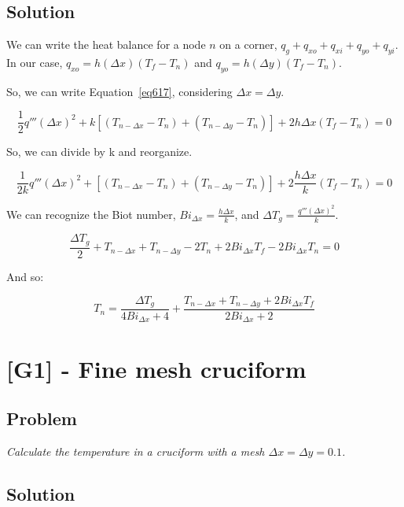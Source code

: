 \subsection{Solution}

We can write the heat balance for a node $n$ on a corner, $q_g + q_{xo} + q_{xi} + q_{yo} + q_{yi}$. In our case, $q_{xo} = h(\Delta x)(T_f - T_n)$ and $q_{yo} = h(\Delta y)(T_f - T_n)$.

So, we can write Equation~\ref{eq617}, considering $\Delta x = \Delta y$.

\begin{equation}\label{eq617}
\frac{1}{2}q'''(\Delta x)^2 + k[(T_{n-\Delta x} - T_n) + (T_{n-\Delta y} - T_n)] + 2h\Delta x(T_f - T_n) = 0
\end{equation}

So, we can divide by k and reorganize.

\begin{equation}\label{eq618}
\frac{1}{2k}q'''(\Delta x)^2 + [(T_{n-\Delta x} - T_n) + (T_{n-\Delta y} - T_n)] + 2\frac{h\Delta x}{k}(T_f - T_n) = 0
\end{equation}

We can recognize the Biot number, $Bi_{\Delta x} = \frac{h\Delta x}{k}$, and $\Delta T_g = \frac{q'''(\Delta x)^2}{k}$.

\begin{equation}\label{eq619}
\frac{\Delta T_g}{2} + T_{n-\Delta x} + T_{n-\Delta y} - 2T_n + 2Bi_{\Delta x}T_f -  2Bi_{\Delta x}T_n = 0
\end{equation}

And so:

\begin{equation}\label{eq620}
T_n = \frac{\Delta T_g}{4Bi_{\Delta x} + 4} + \frac{T_{n-\Delta x} + T_{n-\Delta y} + 2Bi_{\Delta x}T_f}{2Bi_{\Delta x} + 2}
\end{equation}



\section{[G1] - Fine mesh cruciform}
\label{prob63}

\subsection{Problem}
\textit{Calculate the temperature in a cruciform with a mesh $\Delta x = \Delta y = 0.1$.}

\subsection{Solution}

